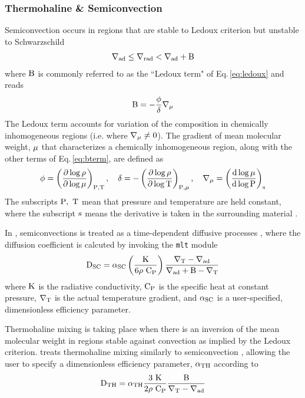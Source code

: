 \documentclass[../../main/thesis_msc.tex]{subfiles}
\begin{document}
				\subsubsection{Thermohaline \& Semiconvection}\label{sec2:thermo_and_semi}
					Semiconvection occurs in regions that are stable to Ledoux criterion but unstable to Schwarzschild
					\begin{align}
						\rm \nabla_{ad} \leq \nabla_{rad} < \nabla_{ad} + B
					\end{align}
					where $\rm B$ is commonly referred to as the ``Ledoux term" of Eq.\,\ref{eq:ledoux} and reads
					\begin{align}\label{eq:bterm}
						\rm B = - \frac{\phi}{\delta} \nabla_{\mu}
					\end{align}
					The Ledoux term accounts for variation of the composition in chemically inhomogeneous regions (i.e. where $\rm \nabla_{\mu} \neq 0$). The gradient of mean molecular weight, $\rm \mu$ that characterizes a chemically inhomogeneous region, along with the other terms of Eq.\,\ref{eq:bterm}, are defined as
					\begin{align}
						\rm \phi = \left(\frac{\partial \log \rho}{\partial \log \mu}  \right)_{P, T}, \quad
						\rm \delta = - \left(\frac{\partial \log \rho}{\partial \log T}  \right)_{P, \mu}, \quad
						\rm \nabla_{\mu} = \left( \frac{d \log \mu}{d \log P} \right)_s			
					\end{align}
					The subscripts $\rm P, \ T$ mean that pressure and temperature are held constant, where the subscript $\rm s$ means the derivative is taken in the surrounding material \citep[pp.~49-50]{Kipp_book}.
					
					In \mesa, semiconvections is treated as a time-dependent diffusive processes \citep{Langer1983}, where the diffusion coefficient is calcuted by invoking the \texttt{mlt} module
					\begin{align}
						\rm D_{SC} = \alpha_{SC} \left( \frac{K}{6 \rho \ C_P} \right) \frac{\nabla_T - \nabla_{ad}}{\nabla_{ad} + B - \nabla_T}
					\end{align}
					where $\rm K$ is the radiative conductivity, $\rm C_P$ is the specific heat at constant pressure, $\rm \nabla_T$ is the actual temperature gradient, and $\rm \alpha_{SC}$ is a user-specified, dimensionless efficiency parameter.	
					
					Thermohaline mixing is taking place when there is an inversion of the mean molecular weight in regions stable against convection as implied by the Ledoux criterion. \mesa treats thermohaline mixing similarly to semiconvection \cite[i.e. as a diffusive process,][]{Kipp_thermohaline}, allowing the user to specify a dimensionless efficiency parameter, $\rm \alpha_{TH}$ according to
					\begin{align}
						\rm D_{TH} = \alpha_{TH} \frac{3 \ K}{2 \rho \ C_P} \frac{B}{\nabla_T - \nabla_{ad}}	
					\end{align}
					
\end{document}
